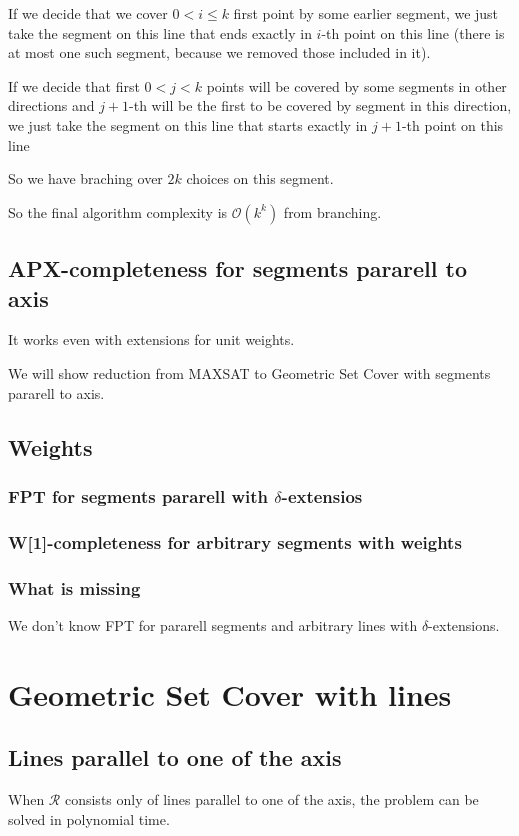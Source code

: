 \documentclass[en]{pracamgr}
\begin{document}
If we decide that we cover $0 < i \le k$ first point by some earlier segment,
we just take the segment on this line that ends exactly in $i$-th point
on this line (there is at most one such segment, because we removed those included in it).

If we decide that first $0 < j < k$ points will be covered by
some segments in other directions and $j+1$-th will be the first 
to be covered by segment in this direction, we just take
the segment on this line that starts exactly in $j+1$-th point
on this line

So we have braching over $2k$ choices on this segment.

So the final algorithm complexity is $\mathcal{O}(k^k)$ from
branching.

\section{APX-completeness for segments pararell to axis}
It works even with extensions for unit weights.

We will show reduction from MAXSAT
to Geometric Set Cover with segments pararell to axis.



\section{Weights}
\subsection{FPT for segments pararell with $\delta$-extensios}
\subsection{W[1]-completeness for arbitrary segments with weights}
\subsection{What is missing}
We don't know FPT for pararell segments
and arbitrary lines with $\delta$-extensions.

\chapter{Geometric Set Cover with lines}
\section{Lines parallel to one of the axis}
When $\mathcal{R}$ consists only of lines parallel to
one of the axis, the problem can be solved in
polynomial time.
\end{document}
